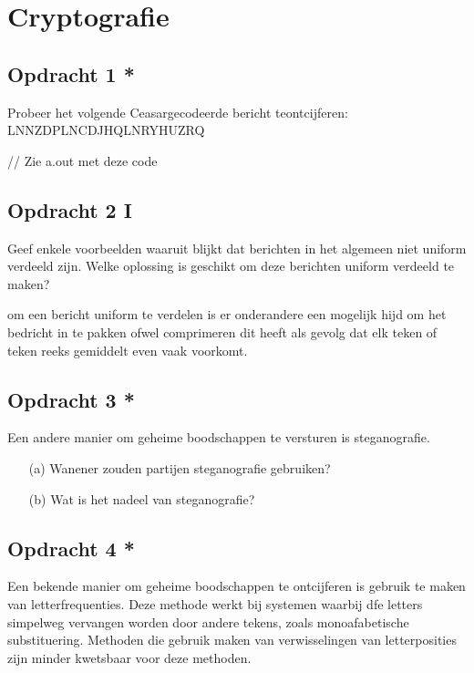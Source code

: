 \chapter{Cryptografie}

\section{Opdracht 1 *}
Probeer het volgende Ceasargecodeerde bericht teontcijferen:
LNNZDPLNCDJHQLNRYHUZRQ

// Zie a.out met deze code


\section{Opdracht 2 I}
Geef enkele voorbeelden waaruit blijkt dat berichten in het algemeen niet uniform verdeeld zijn. Welke oplossing is geschikt om deze berichten uniform verdeeld te maken?

om een bericht uniform te verdelen is er onderandere een mogelijk hijd om het bedricht in te pakken ofwel comprimeren dit heeft als gevolg dat elk teken of teken reeks gemiddelt even vaak voorkomt.

\section{Opdracht 3 *}
Een andere manier om geheime boodschappen te versturen is steganografie.
\begin{itemize}
  \item[(a)] Wanener zouden partijen steganografie gebruiken?
  \item[(b)] Wat is het nadeel van steganografie?
\end{itemize}

\section{Opdracht 4 *}
Een bekende manier om geheime boodschappen te ontcijferen is gebruik te maken van letterfrequenties. Deze methode werkt bij systemen waarbij dfe letters simpelweg vervangen worden door andere tekens, zoals monoafabetische substituering. Methoden die gebruik maken van verwisselingen van letterposities zijn minder kwetsbaar voor deze methoden.

